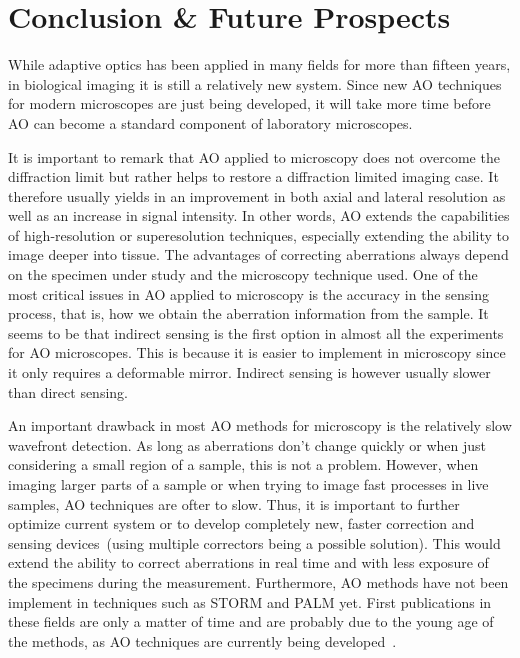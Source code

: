 \section{Conclusion \& Future Prospects}
\label{sec:Future}

While adaptive optics has been applied in many fields for more than fifteen years, in biological imaging it is still a relatively new system. Since new AO techniques for modern microscopes are just being developed, it will take more time before AO can become a standard component of laboratory microscopes.  

It is important to remark that AO applied to microscopy does not overcome the diffraction limit but rather helps to restore a diffraction limited imaging case. It therefore usually yields in an improvement in both axial and lateral resolution as well as an increase in signal intensity. In other words, AO extends the capabilities of high-resolution or superesolution techniques, especially extending the ability to image deeper into tissue. The advantages of correcting aberrations always depend on the specimen under study and the microscopy technique used. One of the most critical issues in AO applied to microscopy is the accuracy in the sensing process, that is, how we obtain the aberration information from the sample. It seems to be that indirect sensing is the first option in almost all the experiments for AO microscopes. This is because it is easier to implement in microscopy since it only requires a deformable mirror. Indirect sensing is however usually slower than direct sensing. 

An important drawback in most AO methods for microscopy is the relatively slow wavefront detection. As long as aberrations don't change quickly or when just considering a small region of a sample, this is not a problem. However, when imaging larger parts of a sample or when trying to image fast processes in live samples, AO techniques are ofter to slow. Thus, it is important to further optimize current system or to develop completely new, faster correction and sensing devices~(using multiple correctors being a possible solution). This would extend the ability to correct aberrations in real time and with less exposure of the specimens during the measurement. Furthermore, AO methods have not been implement in techniques such as STORM and PALM yet. First publications in these fields are only a matter of time and are probably due to the young age of the methods, as AO techniques are currently being developed~\cite{future_AOM_PALM_1}. \newline


